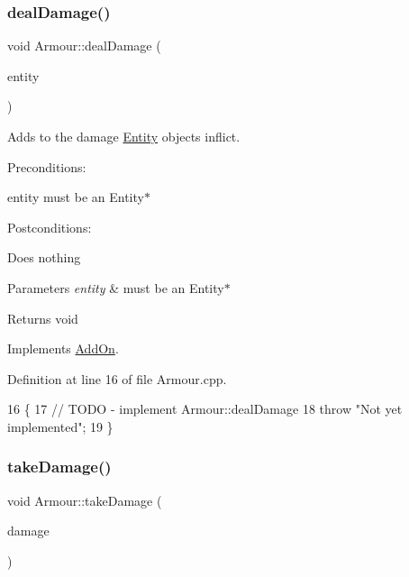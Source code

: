 \subsubsection{\texorpdfstring{deal\+Damage()}{dealDamage()}}
{\footnotesize\ttfamily void Armour\+::deal\+Damage (\begin{DoxyParamCaption}\item[{\hyperlink{classEntity}{Entity} $\ast$}]{entity }\end{DoxyParamCaption})\hspace{0.3cm}{\ttfamily [virtual]}}



Adds to the damage \hyperlink{classEntity}{Entity} objects inflict. 

Preconditions\+:
\begin{DoxyItemize}
\item entity must be an Entity$\ast$
\end{DoxyItemize}

Postconditions\+:
\begin{DoxyItemize}
\item Does nothing
\end{DoxyItemize}


\begin{DoxyParams}{Parameters}
{\em entity} & must be an Entity$\ast$ \\
\hline
\end{DoxyParams}
\begin{DoxyReturn}{Returns}
void 
\end{DoxyReturn}


Implements \hyperlink{classAddOn}{Add\+On}.



Definition at line 16 of file Armour.\+cpp.


\begin{DoxyCode}
16                                       \{
17     \textcolor{comment}{// TODO - implement Armour::dealDamage}
18     \textcolor{keywordflow}{throw} \textcolor{stringliteral}{"Not yet implemented"};
19 \}
\end{DoxyCode}
\mbox{\label{classArmour_a7a52bd8473173c81a4ba8a6373513581}} 
\subsubsection{\texorpdfstring{take\+Damage()}{takeDamage()}}
{\footnotesize\ttfamily void Armour\+::take\+Damage (\begin{DoxyParamCaption}\item[{int}]{damage }\end{DoxyParamCaption})\hspace{0.3cm}{\ttfamily [virtual]}}



